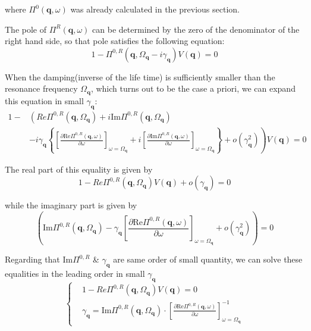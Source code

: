 where $\Pi^0(\mathbf{q},\omega)$ was already calculated in the previous section.

The pole of $\Pi^R(\mathbf{q},\omega)$ can be determined by the zero of the denominator of the right hand side, so that pole satisfies the following equation:
\begin{equation} \label{Eqs3.2.8}
1-\Pi^{0,R}(\mathbf{q},\Omega_{\mathbf{q}}-i \gamma_{\mathbf{q}})V(\mathbf{q}) = 0
\end{equation}

When the damping(inverse of the life time) is sufficiently smaller than the resonance frequency $\Omega_{\mathbf{q}}$, which turns out to be the case a priori, we can expand this equation in small $\gamma_{\mathbf{q}}$:
\begin{equation} \label{Eqs3.2.9} \begin{split}
1-&\left( Re\Pi^{0,R}(\mathbf{q},\Omega_{\mathbf{q}}) + i \text{Im} \Pi^{0,R}(\mathbf{q},\Omega_{\mathbf{q}}) \right.\\
&\left. -i \gamma_{\mathbf{q}} \left\{ \left[ \frac{\partial \text{Re} \Pi^{0,R}(\mathbf{q},\omega)}{\partial \omega} \right]_{\omega=\Omega_{\mathbf{q}}} + i \left[ \frac{\partial \text{Im} \Pi^{0,R}(\mathbf{q},\omega)}{\partial \omega} \right]_{\omega=\Omega_{\mathbf{q}}} \right\} + o(\gamma_{\mathbf{q}}^2) \right)V(\mathbf{q}) = 0
\end{split}\end{equation}

The real part of this equality is given by
\begin{equation} \label{Eqs3.2.10}
1- Re\Pi^{0,R}(\mathbf{q},\Omega_{\mathbf{q}}) V(\mathbf{q}) + o(\gamma_{\mathbf{q}}) = 0
\end{equation}

while the imaginary part is given by
\begin{equation} \label{Eqs3.2.11}
\left( \text{Im} \Pi^{0,R}(\mathbf{q},\Omega_{\mathbf{q}}) - \gamma_{\mathbf{q}} \left[ \frac{\partial \text{Re} \Pi^{0,R}(\mathbf{q},\omega)}{\partial \omega} \right]_{\omega=\Omega_{\mathbf{q}}} + o(\gamma_{\mathbf{q}}^2) \right) = 0
\end{equation}

Regarding that $\text{Im} \Pi^{0,R}$ \& $\gamma_{\mathbf{q}}$ are same order of small quantity, we can solve these equalities in the leading order in small $\gamma_{\mathbf{q}}$
\begin{equation} \label{Eqs3.2.12}
\left\{ \begin{aligned}
&1- Re\Pi^{0,R}(\mathbf{q},\Omega_{\mathbf{q}}) V(\mathbf{q}) = 0\\
&\gamma_{\mathbf{q}} = \text{Im} \Pi^{0,R}(\mathbf{q},\Omega_{\mathbf{q}}) \cdot 
 \left[ \frac{\partial \text{Re} \Pi^{0,R}(\mathbf{q},\omega)}{\partial \omega} \right]_{\omega=\Omega_{\mathbf{q}}}^{-1}
\end{aligned} \right.
\end{equation}


